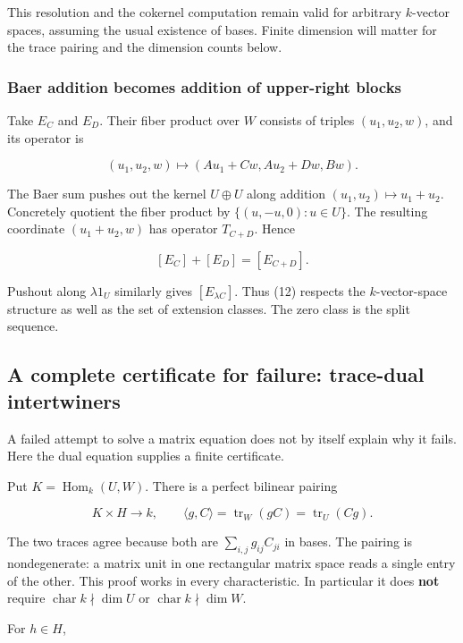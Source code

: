 \documentclass[
  11pt,
]{article}
\begin{document}
This resolution and the cokernel computation remain valid for arbitrary
\(k\)-vector spaces, assuming the usual existence of bases. Finite
dimension will matter for the trace pairing and the dimension counts
below.

\subsubsection{Baer addition becomes addition of upper-right
blocks}\label{baer-addition-becomes-addition-of-upper-right-blocks}

Take \(E_C\) and \(E_D\). Their fiber product over \(W\) consists of
triples \((u_1,u_2,w)\), and its operator is

\[(u_1,u_2,w)\longmapsto(Au_1+Cw,Au_2+Dw,Bw).\]

The Baer sum pushes out the kernel \(U\oplus U\) along addition
\((u_1,u_2)\mapsto u_1+u_2\). Concretely quotient the fiber product by
\(\{(u,-u,0):u\in U\}\). The resulting coordinate \((u_1+u_2,w)\) has
operator \(T_{C+D}\). Hence

\[[E_C]+[E_D]=[E_{C+D}].\tag{13}\]

Pushout along \(\lambda1_U\) similarly gives \([E_{\lambda C}]\). Thus
(12) respects the \(k\)-vector-space structure as well as the set of
extension classes. The zero class is the split sequence.

\subsection{A complete certificate for failure: trace-dual
intertwiners}\label{a-complete-certificate-for-failure-trace-dual-intertwiners}

A failed attempt to solve a matrix equation does not by itself explain
why it fails. Here the dual equation supplies a finite certificate.

Put \(K=\operatorname{Hom}_k(U,W)\). There is a perfect bilinear pairing

\[K\times H\longrightarrow k,\qquad
\langle g,C\rangle=\operatorname{tr}_W(gC)
=\operatorname{tr}_U(Cg).\tag{14}\]

The two traces agree because both are \(\sum_{i,j}g_{ij}C_{ji}\) in
bases. The pairing is nondegenerate: a matrix unit in one rectangular
matrix space reads a single entry of the other. This proof works in
every characteristic. In particular it does \textbf{not} require
\(\operatorname{char}k\nmid\dim U\) or
\(\operatorname{char}k\nmid\dim W\).

For \(h\in H\),
\end{document}
